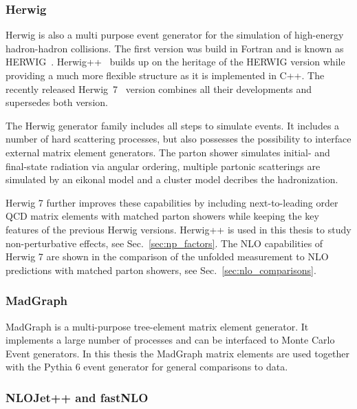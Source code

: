 \subsubsection{Herwig}

Herwig is also a multi purpose event generator for the simulation of high-energy
hadron-hadron collisions. The first version was build in Fortran and is known as
HERWIG~\cite{Corcella:2000bw}. Herwig++~\cite{Bahr:2008pv} builds up on the
heritage of the HERWIG version while providing a much more flexible structure as
it is implemented in C++. The recently released Herwig~7~\cite{Bellm:2015jjp}
version combines all their developments and supersedes both version. 

The Herwig generator family includes all steps to simulate events. It includes a
number of hard scattering processes, but also possesses the possibility to
interface external matrix element generators. The parton shower simulates
initial- and final-state radiation via angular ordering, multiple partonic
scatterings are simulated by an eikonal model and a cluster model decribes the
hadronization. 

Herwig 7 further improves these capabilities by including next-to-leading order
QCD matrix elements with matched parton showers while keeping the key features
of the previous Herwig versions. Herwig++ is used in this thesis to study
non-perturbative effects, see Sec.~\ref{sec:np_factors}. The NLO capabilities of
Herwig 7 are shown in the comparison of the unfolded measurement to NLO
predictions with matched parton showers, see Sec.~\ref{sec:nlo_comparisons}.

\subsubsection{MadGraph}

MadGraph is a multi-purpose tree-element matrix element generator. It implements
a large number of processes and can be interfaced to Monte Carlo Event
generators. In this thesis the MadGraph matrix elements are used together with
the Pythia 6 event generator for general comparisons to data.

\subsubsection{NLOJet++ and fastNLO}
\label{sec:nlojetpp}




